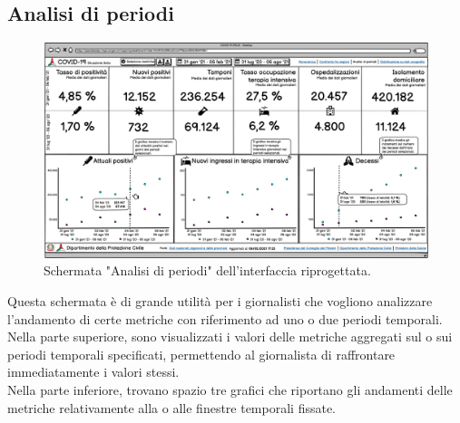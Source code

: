 \documentclass[../../main.tex]{subfiles}
\begin{document}
\subsection{Analisi di periodi}
\begin{figure}[h]
    \centering
    \includegraphics[width = \textwidth]{res/img/1 - Analisi di periodi}
    \caption{Schermata "Analisi di periodi" dell'interfaccia riprogettata.}
    \label{fig:analisi-periodi}
\end{figure}
Questa schermata è di grande utilità per i giornalisti che vogliono analizzare l'andamento di certe metriche con riferimento ad uno o due periodi temporali.\\
Nella parte superiore, sono visualizzati i valori delle metriche aggregati sul o sui periodi temporali specificati, permettendo al giornalista di raffrontare immediatamente i valori stessi.\\
Nella parte inferiore, trovano spazio tre grafici che riportano gli andamenti delle metriche relativamente alla o alle finestre temporali fissate.

\clearpage
\end{document}
